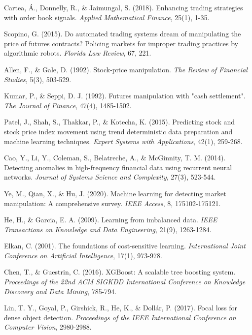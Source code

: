 \documentclass[12pt,a4paper]{article}
\begin{document}
\begin{thebibliography}{99}

Cartea, Á., Donnelly, R., \& Jaimungal, S. (2018). Enhancing trading strategies with order book signals. \textit{Applied Mathematical Finance}, 25(1), 1-35.

Scopino, G. (2015). Do automated trading systems dream of manipulating the price of futures contracts? Policing markets for improper trading practices by algorithmic robots. \textit{Florida Law Review}, 67, 221.

Allen, F., \& Gale, D. (1992). Stock-price manipulation. \textit{The Review of Financial Studies}, 5(3), 503-529.

Kumar, P., \& Seppi, D. J. (1992). Futures manipulation with "cash settlement". \textit{The Journal of Finance}, 47(4), 1485-1502.

Patel, J., Shah, S., Thakkar, P., \& Kotecha, K. (2015). Predicting stock and stock price index movement using trend deterministic data preparation and machine learning techniques. \textit{Expert Systems with Applications}, 42(1), 259-268.

Cao, Y., Li, Y., Coleman, S., Belatreche, A., \& McGinnity, T. M. (2014). Detecting anomalies in high-frequency financial data using recurrent neural networks. \textit{Journal of Systems Science and Complexity}, 27(3), 523-544.

Ye, M., Qian, X., \& Hu, J. (2020). Machine learning for detecting market manipulation: A comprehensive survey. \textit{IEEE Access}, 8, 175102-175121.

He, H., \& Garcia, E. A. (2009). Learning from imbalanced data. \textit{IEEE Transactions on Knowledge and Data Engineering}, 21(9), 1263-1284.

Elkan, C. (2001). The foundations of cost-sensitive learning. \textit{International Joint Conference on Artificial Intelligence}, 17(1), 973-978.

Chen, T., \& Guestrin, C. (2016). XGBoost: A scalable tree boosting system. \textit{Proceedings of the 22nd ACM SIGKDD International Conference on Knowledge Discovery and Data Mining}, 785-794.

Lin, T. Y., Goyal, P., Girshick, R., He, K., \& Dollár, P. (2017). Focal loss for dense object detection. \textit{Proceedings of the IEEE International Conference on Computer Vision}, 2980-2988.

\end{thebibliography}
\end{document}
